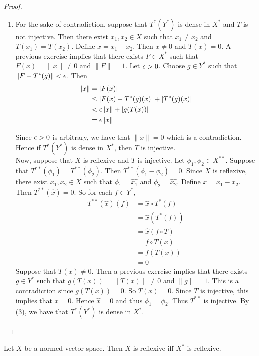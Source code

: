 \documentclass{book}
\begin{document}
\begin{proof}
\begin{enumerate}
			\item For the sake of contradiction, suppose that $T^*(Y^*)$ is dense in $X^*$ and $T$ is not injective. Then there exist $x_1, x_2 \in X$ such that $x_1 \neq x_2$ and $T(x_1) = T(x_2)$. Define $x = x_1-x_2$. Then $x \neq 0$ and $T(x) = 0$. A previous exercise implies that there exists $F \in X^*$ such that $F(x) = \|x\|\neq 0$ and $\|F \|= 1$. Let $\epsilon >0$. Choose $g \in Y^*$ such that $\|F - T^*(g) \|< \epsilon$. Then 
			\begin{align*}
				\|x \|
				&= \vert F(x) \vert \\
				&\leq \vert F(x) - T^*(g)(x) \vert + \vert T^*(g)(x) \vert \\
				& < \epsilon \|x \|+ \vert g(T(x)) \vert\\
				&= \epsilon \|x \|
			\end{align*}
			
			Since $\epsilon > 0$ is arbitrary, we have that $\|x \|=0$ which is a contradiction. Hence if $T^*(Y^*) $ is dense in $X^*$, then $T$ is injective. \vspace{.5cm}\\ 
			Now, suppose that $X$ is reflexive and $T$ is injective. Let $\phi_1, \phi_2 \in X^{**}$. Suppose that $T^{**}(\phi_1) = T^{**}(\phi_2)$. Then $T^{**}(\phi_1 - \phi_2) = 0$. Since $X$ is reflexive, there exist $x_1, x_2 \in X$ such that $\phi_1 = \hat{x_1}$ and $\phi_2 = \hat{x_2}$. Define $x = x_1 - x_2$. Then $T^{**}(\hat{x}) = 0$. So for each $f \in Y^*$, 
			\begin{align*}
				T^{**}(\hat{x})(f) 
				&= \hat{x} \circ T^*(f)\\
				&= \hat{x}( T^*(f))\\
				&= \hat{x} (f \circ T)\\
				&= f \circ T(x)\\
				&= f(T(x))\\
				&= 0 
			\end{align*}
			Suppose that $T(x) \neq 0$. Then a previous exercise implies that there exists $g \in Y^*$ such that $g(T(x)) = \|T(x) \|\neq 0$ and $\|g \| = 1$. This is a contradiction since $g(T(x)) = 0$. So $T(x) = 0$. Since $T$ is injective, this implies that $x = 0$. Hence $\hat{x}=0$ and thus $\phi_1 = \phi_2$. Thus $T^{**}$ is injective. By (3), we have that $T^*(Y^*)$ is dense in $X^*$.
		\end{enumerate}
	\end{proof}
	
	\begin{ex} \lex{}
		Let $X$ be a normed vector space. Then $X$ is reflexive iff $X^*$ is reflexive. 
	\end{ex}
	
\end{document}
